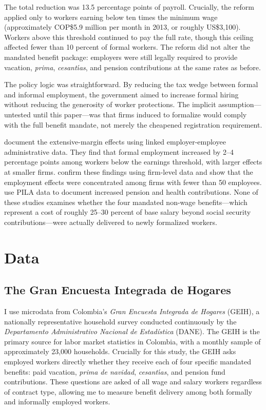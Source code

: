 \documentclass[12pt]{article}
\begin{document}
The total reduction was 13.5 percentage points of payroll. Crucially, the reform applied only to workers earning below ten times the minimum wage (approximately COP\$5.9 million per month in 2013, or roughly US\$3,100). Workers above this threshold continued to pay the full rate, though this ceiling affected fewer than 10 percent of formal workers. The reform did not alter the mandated benefit package: employers were still legally required to provide vacation, \textit{prima}, \textit{cesant\'{\i}as}, and pension contributions at the same rates as before.

The policy logic was straightforward. By reducing the tax wedge between formal and informal employment, the government aimed to increase formal hiring without reducing the generosity of worker protections. The implicit assumption---untested until this paper---was that firms induced to formalize would comply with the full benefit mandate, not merely the cheapened registration requirement.

\citet{kugler2017effects} document the extensive-margin effects using linked employer-employee administrative data. They find that formal employment increased by 2--4 percentage points among workers below the earnings threshold, with larger effects at smaller firms. \citet{bernal2017payroll} confirm these findings using firm-level data and show that the employment effects were concentrated among firms with fewer than 50 employees. \citet{morales2017effect} use PILA data to document increased pension and health contributions. None of these studies examines whether the four mandated non-wage benefits---which represent a cost of roughly 25--30 percent of base salary beyond social security contributions---were actually delivered to newly formalized workers.

\section{Data}
\label{sec:data}

\subsection{The Gran Encuesta Integrada de Hogares}

I use microdata from Colombia's \textit{Gran Encuesta Integrada de Hogares} (GEIH), a nationally representative household survey conducted continuously by the \textit{Departamento Administrativo Nacional de Estad\'{i}stica} (DANE). The GEIH is the primary source for labor market statistics in Colombia, with a monthly sample of approximately 23,000 households. Crucially for this study, the GEIH asks employed workers directly whether they receive each of four specific mandated benefits: paid vacation, \textit{prima de navidad}, \textit{cesant\'{\i}as}, and pension fund contributions. These questions are asked of all wage and salary workers regardless of contract type, allowing me to measure benefit delivery among both formally and informally employed workers.
\end{document}

